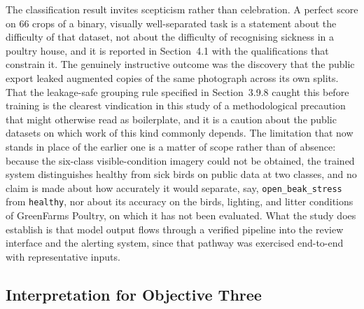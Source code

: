 \documentclass[12pt,a4paper]{report}
\begin{document}
The classification result invites scepticism rather than celebration. A perfect score on 66 crops of a binary, visually well-separated task is a statement about the difficulty of that dataset, not about the difficulty of recognising sickness in a poultry house, and it is reported in Section~4.1 with the qualifications that constrain it. The genuinely instructive outcome was the discovery that the public export leaked augmented copies of the same photograph across its own splits. That the leakage-safe grouping rule specified in Section~3.9.8 caught this before training is the clearest vindication in this study of a methodological precaution that might otherwise read as boilerplate, and it is a caution about the public datasets on which work of this kind commonly depends. The limitation that now stands in place of the earlier one is a matter of scope rather than of absence: because the six-class visible-condition imagery could not be obtained, the trained system distinguishes healthy from sick birds on public data at two classes, and no claim is made about how accurately it would separate, say, \texttt{open\_beak\_stress} from \texttt{healthy}, nor about its accuracy on the birds, lighting, and litter conditions of GreenFarms Poultry, on which it has not been evaluated. What the study does establish is that model output flows through a verified pipeline into the review interface and the alerting system, since that pathway was exercised end-to-end with representative inputs.

\subsection{Interpretation for Objective Three}
\end{document}
